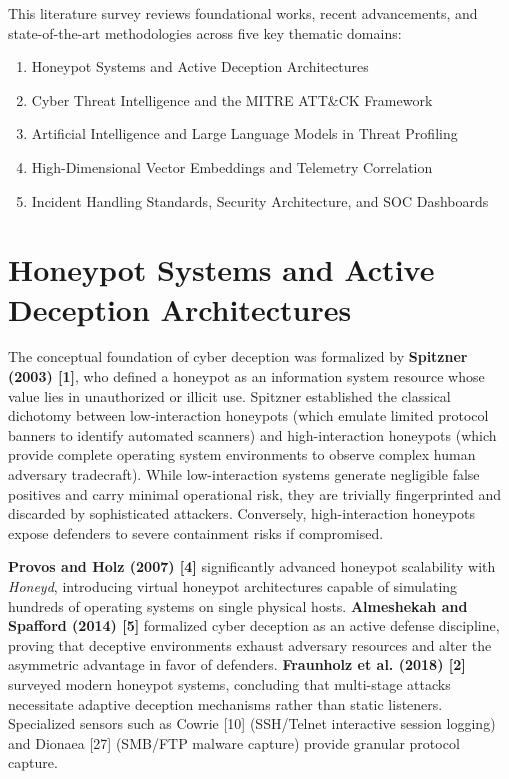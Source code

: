 \documentclass[12pt,a4paper]{report}
\begin{document}
This literature survey reviews foundational works, recent advancements, and state-of-the-art methodologies across five key thematic domains:
\begin{enumerate}
\item Honeypot Systems and Active Deception Architectures
\item Cyber Threat Intelligence and the MITRE ATT\&CK Framework
\item Artificial Intelligence and Large Language Models in Threat Profiling
\item High-Dimensional Vector Embeddings and Telemetry Correlation
\item Incident Handling Standards, Security Architecture, and SOC Dashboards
\end{enumerate}


\section{Honeypot Systems and Active Deception Architectures}

The conceptual foundation of cyber deception was formalized by \textbf{Spitzner (2003) [1]}, who defined a honeypot as an information system resource whose value lies in unauthorized or illicit use. Spitzner established the classical dichotomy between low-interaction honeypots (which emulate limited protocol banners to identify automated scanners) and high-interaction honeypots (which provide complete operating system environments to observe complex human adversary tradecraft). While low-interaction systems generate negligible false positives and carry minimal operational risk, they are trivially fingerprinted and discarded by sophisticated attackers. Conversely, high-interaction honeypots expose defenders to severe containment risks if compromised.

\textbf{Provos and Holz (2007) [4]} significantly advanced honeypot scalability with \emph{Honeyd}, introducing virtual honeypot architectures capable of simulating hundreds of operating systems on single physical hosts. \textbf{Almeshekah and Spafford (2014) [5]} formalized cyber deception as an active defense discipline, proving that deceptive environments exhaust adversary resources and alter the asymmetric advantage in favor of defenders. \textbf{Fraunholz et al. (2018) [2]} surveyed modern honeypot systems, concluding that multi-stage attacks necessitate adaptive deception mechanisms rather than static listeners. Specialized sensors such as Cowrie [10] (SSH/Telnet interactive session logging) and Dionaea [27] (SMB/FTP malware capture) provide granular protocol capture.
\end{document}
